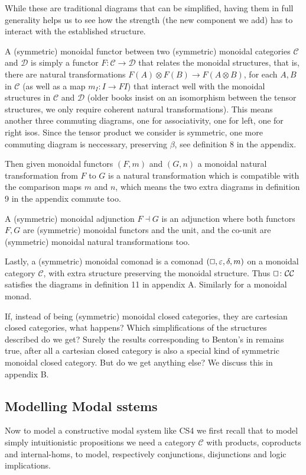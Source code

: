 \documentclass{article}
\let\mto\to
\let\to\relax
\newcommand{\to}{\rightarrow}
\renewcommand{\Box}{\oblong}
\newcommand{\cat}[1]{\mathcal{#1}}
\begin{document}
  While these are traditional diagrams that can be simplified, having them in full generality helps us to see how the strength (the new component we add) has to interact with the established structure.

A (symmetric) monoidal functor between two (symmetric) monoidal categories $\cat{C}$ and $\cat{D}$ is simply a functor $F\colon \cat{C} \mto \cat{D}$ that relates the monoidal structures, that is, there are natural transformations  $F(A)\otimes F(B)\mto F(A \otimes B)$, for each $A,B$ in $\cat{C}$ (as well as a map $m_{I}\colon I \mto FI$) that interact well with the monoidal structures  in $\cat{C}$ and  $\cat{D}$ (older books insist on an isomorphism between the tensor structures, we only require coherent natural transformations). This means another three commuting diagrams, one for associativity, one for left, one for right isos. Since the tensor product we consider is symmetric, one more commuting diagram is neccessary, preserving $\beta$, see definition 8 %
in the appendix.

Then given monoidal functors $(F,m)$ and $(G,n)$ a monoidal natural transformation from $F$ to $G$ is a natural transformation which is compatible with the comparison maps $m$ and $n$, which means the two extra diagrams in definition 9 in the appendix commute too.

A (symmetric) monoidal adjunction $F \dashv G$ is an adjunction  where both functors $F,G$  are (symmetric) monoidal functors and the unit, and the co-unit are (symmetric) monoidal natural transformations too. 

Lastly, a (symmetric) monoidal comonad is a comonad $(\Box,\varepsilon, \delta, m)$ on a monoidal category $\cat{C}$, with extra structure preserving the monoidal structure. Thus $\Box\colon \cat{C}\to \cat{C}$ satisfies the  diagrams in definition 11 in appendix A.{}
Similarly for a monoidal monad.

If, instead of being (symmetric) monoidal closed categories, they are cartesian closed categories, what happens? Which simplifications of the structures described do we get? Surely the results corresponding to Benton's  in \cite{benton1995} remains true, after all a cartesian closed category is also a special kind of symmetric monoidal closed category. But do we get anything else? We discuss this in appendix B.

\subsection{Modelling Modal sstems}
Now to model a constructive modal system like CS4 we first recall that to model simply intuitionistic propositions we need a category  $\cat{C}$ with products, coproducts and internal-homs, to model, respectively conjunctions, disjunctions and logic implications. 
\end{document}
